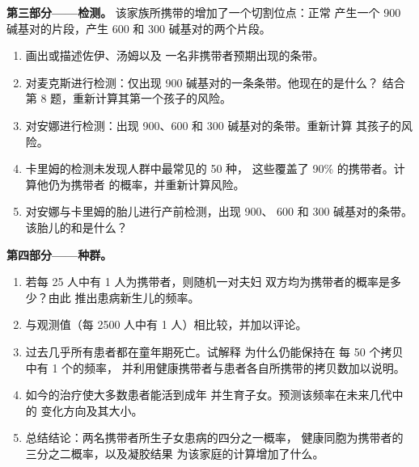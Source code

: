 \begin{problem}
\medskip
\noindent\textbf{第三部分——检测。}
该家族所携带的增加了一个切割位点：正常
产生一个 900 碱基对的片段，产生 600
和 300 碱基对的两个片段。
\begin{enumerate}[resume]
  \item 画出或描述佐伊、汤姆以及
        一名非携带者预期出现的条带。
  \item 对麦克斯进行检测：仅出现 900 碱基对的一条条带。他现在的是什么？
        结合第 8 题，重新计算其第一个孩子的风险。
  \item 对安娜进行检测：出现 900、600 和 300 碱基对的条带。重新计算
        其孩子的风险。
  \item 卡里姆的检测未发现人群中最常见的 50 种，
        这些覆盖了 90\% 的携带者。计算他仍为携带者
        的概率，并重新计算风险。
  \item 对安娜与卡里姆的胎儿进行产前检测，出现 900、
        600 和 300 碱基对的条带。该胎儿的和是什么？
\end{enumerate}

\medskip
\noindent\textbf{第四部分——种群。}
\begin{enumerate}[resume]
  \item 若每 25 人中有 1 人为携带者，则随机一对夫妇
        双方均为携带者的概率是多少？由此
        推出患病新生儿的频率。
  \item 与观测值（每 2500 人中有 1 人）相比较，并加以评论。
  \item 过去几乎所有患者都在童年期死亡。试解释
        为什么仍能保持在
        每 50 个拷贝中有 1 个的频率，
        并利用健康携带者与患者各自所携带的拷贝数加以说明。
  \item 如今的治疗使大多数患者能活到成年
        并生育子女。预测该频率在未来几代中的
        变化方向及其大小。
  \item 总结结论：两名携带者所生子女患病的四分之一概率，
        健康同胞为携带者的三分之二概率，以及凝胶结果
        为该家庭的计算增加了什么。
\end{enumerate}
\end{problem}
